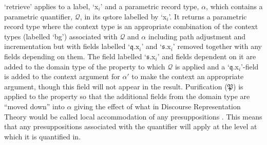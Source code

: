 
`$\mathrm{retrieve}$' applies to a label, `x$_i$' and a parametric
record type, $\alpha$, which contains a parametric quantifier,
$\mathcal{Q}$, in its qstore labelled by `x$_i$'.  It returns a
parametric record type where the context type is an appropriate
combination of the context types (labelled `bg') associated with
$\mathcal{Q}$ and $\alpha$ including path adjustment and
incrementation but with fields labelled `$\mathfrak{q}.\text{x}_i$'
and `$\mathfrak{s}.\text{x}_i$' removed together with any fields
depending on them.  The field labelled `$\mathfrak{s}$.x$_i$' and
fields dependent on it are added to the
domain type of the property to which $\mathcal{Q}$ is applied  and a
`$\mathfrak{q}$.x$_i$'-field is added to the context argument for
$\alpha'$ to make the context an appropriate argument,
though this field will not appear in the result.  
Purification ($\mathfrak{P}$) is applied to the property so that the
additional fields from the domain type are ``moved down'' into $\alpha$ giving the effect
of what in Discourse Representation Theory would be called local
accommodation of any presuppositions \citep{VanderSandt1992}.  This
means that any presuppositions associated with the quantifier will
apply at the level at which it is quantified in.


